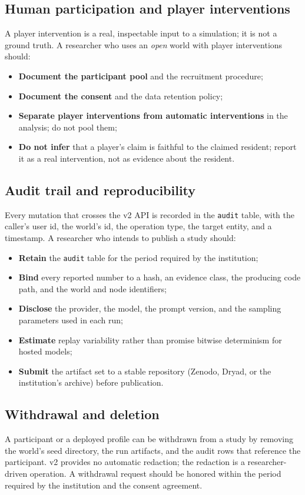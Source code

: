 \subsection{Human participation and player interventions}

A player intervention is a real, inspectable input to a simulation;
it is not a ground truth.  A researcher who uses an
\emph{open} world with player interventions should:

\begin{itemize}[leftmargin=*]
  \item \textbf{Document the participant pool} and the recruitment
  procedure;
  \item \textbf{Document the consent} and the data retention
  policy;
  \item \textbf{Separate player interventions from automatic
  interventions} in the analysis; do not pool them;
  \item \textbf{Do not infer} that a player's claim is faithful to
  the claimed resident; report it as a real intervention, not as
  evidence about the resident.
\end{itemize}

\subsection{Audit trail and reproducibility}

Every mutation that crosses the v2 API is recorded in the
\texttt{audit} table, with the caller's user id, the world's id, the
operation type, the target entity, and a timestamp.  A researcher
who intends to publish a study should:

\begin{itemize}[leftmargin=*]
  \item \textbf{Retain} the \texttt{audit} table for the period
  required by the institution;
  \item \textbf{Bind} every reported number to a hash, an
  evidence class, the producing code path, and the world and node
  identifiers;
  \item \textbf{Disclose} the provider, the model, the prompt
  version, and the sampling parameters used in each run;
  \item \textbf{Estimate} replay variability rather than promise
  bitwise determinism for hosted models;
  \item \textbf{Submit} the artifact set to a stable repository
  (Zenodo, Dryad, or the institution's archive) before
  publication.
\end{itemize}

\subsection{Withdrawal and deletion}

A participant or a deployed profile can be withdrawn from a study
by removing the world's seed directory, the run artifacts, and the
audit rows that reference the participant.  v2 provides no
automatic redaction; the redaction is a researcher-driven
operation.  A withdrawal request should be honored within the
period required by the institution and the consent agreement.

